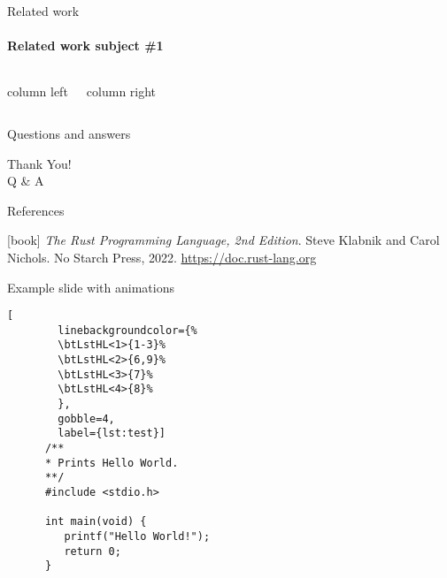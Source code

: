 
\begin{frame}{Related work}
    \framesubtitle{Related work subject \#1}
    \begin{columns}[T]

        column left

        column right
    \end{columns}


\end{frame}

\begin{frame}{Questions and answers}
    \begin{center}
    {\fontsize{40}{50}\selectfont Thank You! \\[10pt] Q \& A}
    \end{center}
\end{frame}

\begin{frame}[allowframebreaks]{References}
    \begin{thebibliography}{}
        [book]
        \emph{The Rust Programming Language, 2nd Edition}.
        \newblock Steve Klabnik and Carol Nichols.
        \newblock No Starch Press, 2022.
        \newblock \url{https://doc.rust-lang.org}


    \end{thebibliography}
\end{frame}

\begin{frame}[fragile]{Example slide with animations}
    \begin{lstlisting}[
        linebackgroundcolor={%
        \btLstHL<1>{1-3}%
        \btLstHL<2>{6,9}%
        \btLstHL<3>{7}%
        \btLstHL<4>{8}%
        },
        gobble=4,
        label={lst:test}]
      /**
      * Prints Hello World.
      **/
      #include <stdio.h>

      int main(void) {
         printf("Hello World!");
         return 0;
      }
    \end{lstlisting}

\end{frame}
